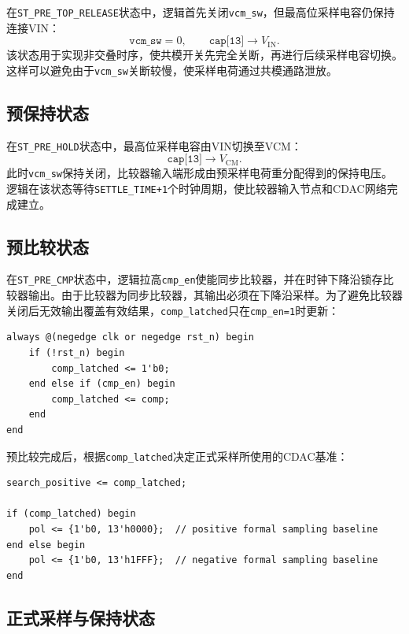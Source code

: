 在\texttt{ST\_PRE\_TOP\_RELEASE}状态中，逻辑首先关闭\texttt{vcm\_sw}，但最高位采样电容仍保持连接VIN：
\begin{equation}
    \texttt{vcm\_sw}=0,\qquad
    \texttt{cap[13]} \rightarrow V_{\mathrm{IN}}.
\end{equation}
该状态用于实现非交叠时序，使共模开关先完全关断，再进行后续采样电容切换。这样可以避免由于\texttt{vcm\_sw}关断较慢，使采样电荷通过共模通路泄放。

\subsection{预保持状态}

在\texttt{ST\_PRE\_HOLD}状态中，最高位采样电容由VIN切换至VCM：
\begin{equation}
    \texttt{cap[13]} \rightarrow V_{\mathrm{CM}}.
\end{equation}
此时\texttt{vcm\_sw}保持关闭，比较器输入端形成由预采样电荷重分配得到的保持电压。逻辑在该状态等待\texttt{SETTLE\_TIME+1}个时钟周期，使比较器输入节点和CDAC网络完成建立。

\subsection{预比较状态}

在\texttt{ST\_PRE\_CMP}状态中，逻辑拉高\texttt{cmp\_en}使能同步比较器，并在时钟下降沿锁存比较器输出。由于比较器为同步比较器，其输出必须在下降沿采样。为了避免比较器关闭后无效输出覆盖有效结果，\texttt{comp\_latched}只在\texttt{cmp\_en=1}时更新：
\begin{lstlisting}[style=verilogstyle]
always @(negedge clk or negedge rst_n) begin
    if (!rst_n) begin
        comp_latched <= 1'b0;
    end else if (cmp_en) begin
        comp_latched <= comp;
    end
end
\end{lstlisting}

预比较完成后，根据\texttt{comp\_latched}决定正式采样所使用的CDAC基准：
\begin{lstlisting}[style=verilogstyle]
search_positive <= comp_latched;

if (comp_latched) begin
    pol <= {1'b0, 13'h0000};  // positive formal sampling baseline
end else begin
    pol <= {1'b0, 13'h1FFF};  // negative formal sampling baseline
end
\end{lstlisting}

\subsection{正式采样与保持状态}

